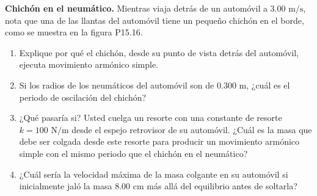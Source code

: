 \item \textbf{Chichón en el neumático.}
Mientras viaja detrás de un automóvil a $3.00\text{ m/s}$, nota que una de las llantas del automóvil tiene un pequeño chichón en el borde, como se muestra en la figura P15.16.
\begin{enumerate}
    \item Explique por qué el chichón, desde su punto de vista detrás del automóvil, ejecuta movimiento armónico simple.
    \item Si los radios de los neumáticos del automóvil son de $0.300\text{ m}$, ¿cuál es el periodo de oscilación del chichón?
    \item ¿Qué pasaría si? Usted cuelga un resorte con una constante de resorte $k = 100\text{ N/m}$ desde el espejo retrovisor de su automóvil. ¿Cuál es la masa que debe ser colgada desde este resorte para producir un movimiento armónico simple con el mismo periodo que el chichón en el neumático?
    \item ¿Cuál sería la velocidad máxima de la masa colgante en su automóvil si inicialmente jaló la masa $8.00\text{ cm}$ más allá del equilibrio antes de soltarla?
\end{enumerate}